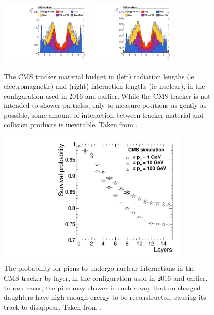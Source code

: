  \begin{figure}[h!]
    \centering
    \includegraphics[width=0.4\textwidth]{figures/MaterialBudget_RadLengths.pdf}
    \includegraphics[width=0.4\textwidth]{figures/MaterialBudget_InteractionLengths.pdf}
    \caption[Tracker material budget.]{
      The CMS tracker material budget in (left) radiation lengths (ie electromagnetic) and (right) interaction lengths (ie nuclear), in the configuration used in 2016 and earlier. 
      While the CMS tracker is not intended to shower particles, only to measure positions as gently as possible, some amount of interaction between tracker material and collision products is inevitable.
      Taken from \cite{cmstracking}.}
    \label{fig:trackerbudget}
  \end{figure}  

  \begin{figure}[h!]
    \centering
    \includegraphics[width=0.85\textwidth]{figures/PionSurvivalProbability.pdf}
    \caption[Pion survival in the tracker.]{
      The probability for pions to undergo nuclear interactions in the CMS tracker by layer, in the configuration used in 2016 and earlier. 
      In rare cases, the pion may shower in such a way that no charged daughters have high enough energy to be reconstructed, causing its track to disappear.
      Taken from \cite{cmstracking}.}
    \label{fig:pionsurvival}
  \end{figure}  

